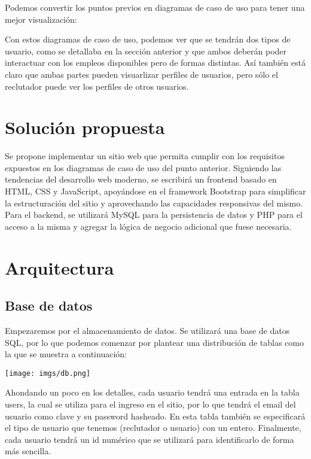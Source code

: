 \documentclass[a4paper]{article}
\begin{document}
Podemos convertir los puntos previos en diagramas de caso de uso para tener
una mejor visualización:

\begin{figure}[H]
    \centering
    \scalebox{.6}{
        
    }
\end{figure}
\begin{figure}[H]
    \centering
    \scalebox{.6}{
        
    }
\end{figure}

Con estos diagramas de caso de uso, podemos ver que se tendrán dos tipos de
usuario, como se detallaba en la sección anterior y que ambos deberán poder
interactuar con los empleos disponibles pero de formas distintas. Así también
está claro que ambas partes pueden visuarlizar perfiles de usuarios, pero
sólo el reclutador puede ver los perfiles de otros usuarios.

\section{Solución propuesta}
Se propone implementar un sitio web que permita cumplir con los requisitos
expuestos en los diagramas de caso de uso del punto anterior. Siguiendo
las tendencias del desarrollo web moderno, se escribirá un frontend basado en
HTML, CSS y JavaScript, apoyándose en el framework Bootstrap para simplificar
la estructuración del sitio y aprovechando las capacidades responsivas del
mismo. Para el backend, se utilizará MySQL para la persistencia de datos y
PHP para el acceso a la misma y agregar la lógica de negocio adicional que
fuese necesaria.

\section{Arquitectura}
\subsection{Base de datos}
Empezaremos por el almacenamiento de datos. Se utilizará una base de datos SQL,
por lo que podemos comenzar por plantear una distribución de tablas como la
que se muestra a continuación:

\texttt{[image: imgs/db.png]}

Ahondando un poco en los detalles, cada usuario tendrá una entrada en la tabla
users, la cual se utiliza para el ingreso en el sitio, por lo que tendrá el
email del usuario como clave y su password hasheado. En esta tabla también se
especificará el tipo de usuario que tenemos (reclutador o usuario) con un
entero. Finalmente, cada usuario tendrá un id numérico que se utilizará para
identificarlo de forma más sencilla.
\end{document}
